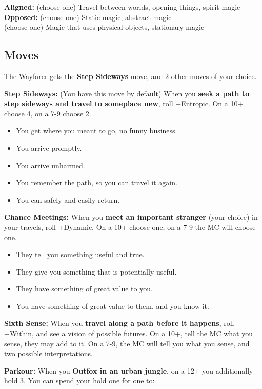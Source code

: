\documentclass[
  oneside,
  statementpaper,
  9pt]{memoir}
\begin{document}
\textbf{Aligned:} (choose one) Travel between worlds, opening things,
spirit magic\\
\textbf{Opposed:} (choose one) Static magic, abstract magic\\
(choose one) Magic that uses physical objects, stationary magic

\hypertarget{moves-8}{%
\subsection{Moves}\label{moves-8}}

The Wayfarer gets the \textbf{Step Sideways} move, and 2 other moves of
your choice.

\textbf{Step Sideways:} (You have this move by default) When you
\textbf{seek a path to step sideways and travel to someplace new}, roll
+Entropic. On a 10+ choose 4, on a 7-9 choose 2.

\begin{itemize}
\tightlist
\item
  You get where you meant to go, no funny business.
\item
  You arrive promptly.
\item
  You arrive unharmed.
\item
  You remember the path, so you can travel it again.
\item
  You can safely and easily return.
\end{itemize}

\textbf{Chance Meetings:} When you \textbf{meet an important stranger}
(your choice) in your travels, roll +Dynamic. On a 10+ choose one, on a
7-9 the MC will choose one.

\begin{itemize}
\tightlist
\item
  They tell you something useful and true.
\item
  They give you something that is potentially useful.
\item
  They have something of great value to you.
\item
  You have something of great value to them, and you know it.
\end{itemize}

\textbf{Sixth Sense:} When you \textbf{travel along a path before it
happens}, roll +Within, and see a vision of possible futures. On a 10+,
tell the MC what you sense, they may add to it. On a 7-9, the MC will
tell you what you sense, and two possible interpretations.

\textbf{Parkour:} When you \textbf{Outfox in an urban jungle}, on a 12+
you additionally hold 3. You can spend your hold one for one to:
\end{document}
